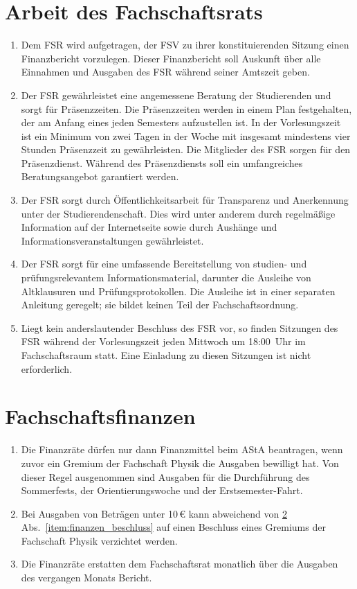 \section{Arbeit des Fachschaftsrats}
\begin{enumerate}
	\item Dem FSR wird aufgetragen, der FSV zu ihrer konstituierenden Sitzung einen Finanzbericht vorzulegen.
	Dieser Finanzbericht soll Auskunft über alle Einnahmen und Ausgaben des FSR während seiner Amtszeit geben.
	\item Der FSR gewährleistet eine angemessene Beratung der Studierenden und sorgt für Präsenzzeiten.
	Die Präsenzzeiten werden in einem Plan festgehalten, der am Anfang eines jeden Semesters aufzustellen ist.
	In der Vorlesungszeit ist ein Minimum von zwei Tagen in der Woche mit insgesamt mindestens vier Stunden Präsenzzeit zu gewährleisten.
	Die Mitglieder des FSR sorgen für den Präsenzdienst.
	Während des Präsenzdiensts soll ein umfangreiches Beratungsangebot garantiert werden.
	\item Der FSR sorgt durch Öffentlichkeitsarbeit für Transparenz und Anerkennung unter der Studierendenschaft.
	Dies wird unter anderem durch regelmäßige Information auf der Internetseite sowie durch Aushänge und Informationsveranstaltungen gewährleistet.
	\item Der FSR sorgt für eine umfassende Bereitstellung von studien- und prüfungsrelevantem Informationsmaterial, darunter die Ausleihe von Altklausuren und Prüfungsprotokollen.
	Die Ausleihe ist in einer separaten Anleitung geregelt; sie bildet keinen Teil der Fachschaftsordnung.
	\item Liegt kein anderslautender Beschluss des FSR vor, so finden Sitzungen des FSR während der Vorlesungszeit jeden Mittwoch um 18:00~Uhr im Fachschaftsraum statt.
	Eine Einladung zu diesen Sitzungen ist nicht erforderlich.
\end{enumerate}

\section{Fachschaftsfinanzen}
\label{sec:finanzen}
\begin{enumerate}
	\item \label{item:finanzen_beschluss}
Die Finanzräte dürfen nur dann Finanzmittel beim AStA beantragen, wenn zuvor ein Gremium der Fachschaft Physik die Ausgaben bewilligt hat.
	Von dieser Regel ausgenommen sind Ausgaben für die Durchführung des Sommerfests, der Orientierungswoche und der Erstsemester-Fahrt.
	\item Bei Ausgaben von Beträgen unter 10\,€ kann abweichend von \ref{sec:finanzen} Abs.~\ref{item:finanzen_beschluss} auf einen Beschluss eines Gremiums der Fachschaft Physik verzichtet werden.
	\item Die Finanzräte erstatten dem Fachschaftsrat monatlich über die Ausgaben des vergangen Monats Bericht.
\end{enumerate}

